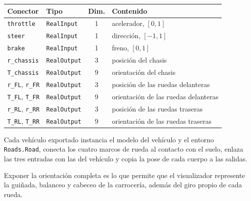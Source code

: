 \begin{center}
\begin{tabular}{llcl}
\hline
\textbf{Conector} & \textbf{Tipo} & \textbf{Dim.} & \textbf{Contenido} \\
\hline
\verb|throttle| & \verb|RealInput| & 1 & acelerador, $[0,1]$ \\
\verb|steer|    & \verb|RealInput| & 1 & dirección, $[-1,1]$ \\
\verb|brake|    & \verb|RealInput| & 1 & freno, $[0,1]$ \\
\hline
\verb|r_chassis| & \verb|RealOutput| & 3 & posición del chasis \\
\verb|T_chassis| & \verb|RealOutput| & 9 & orientación del chasis \\
\verb|r_FL|, \verb|r_FR| & \verb|RealOutput| & 3 & posición de las ruedas delanteras \\
\verb|T_FL|, \verb|T_FR| & \verb|RealOutput| & 9 & orientación de las ruedas delanteras \\
\verb|r_RL|, \verb|r_RR| & \verb|RealOutput| & 3 & posición de las ruedas traseras \\
\verb|T_RL|, \verb|T_RR| & \verb|RealOutput| & 9 & orientación de las ruedas traseras \\
\hline
\end{tabular}
\end{center}

Cada vehículo exportado instancia el modelo del vehículo y el entorno \verb|Roads.Road|, conecta los cuatro marcos de rueda al contacto con el suelo, enlaza las tres entradas con las del vehículo y copia la pose de cada cuerpo a las salidas.


Exponer la orientación completa es lo que permite que el visualizador represente la guiñada, balanceo y cabeceo de la carrocería, además del giro propio de cada rueda.\\


